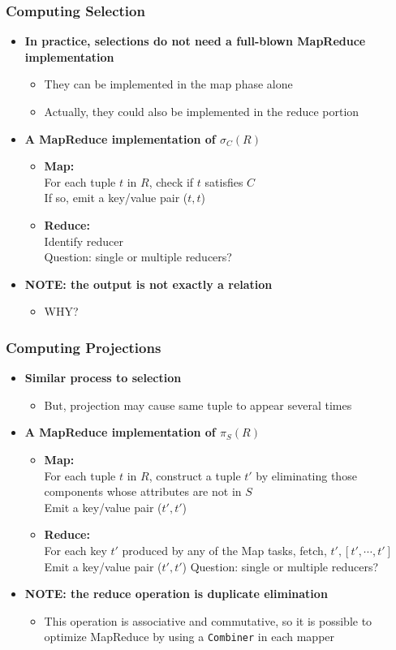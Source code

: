 \documentclass{beamer}
\newcommand{\bi}{\begin{itemize}}
\newcommand{\ei}{\end{itemize}}
\newcommand{\ii}{\item}
\newcommand*{\mygreen}[1]{\textcolor{mygreen}{#1}}
\newcommand*{\myred}[1]{\textcolor{myred}{#1}}
\newcommand{\select}{\sigma}
\newcommand{\project}{\pi}
\begin{document}
\begin{frame}
\frametitle{Computing Selection}
\bi
\ii \textbf{In practice, selections do not need a full-blown MapReduce implementation}
\bi
\ii They can be implemented in the \myred{map phase alone}
\ii Actually, they could also be implemented in the reduce portion
\ei
\ei

\bi
\ii \textbf{A MapReduce implementation of $\select_C(R)$}
\bi
\ii \mygreen{\textbf{Map:}} \\
For each tuple $t$ in $R$, check if $t$ satisfies $C$ \\
If so, emit a key/value pair ($t, t$)
\ii \mygreen{\textbf{Reduce:}}\\
Identify reducer \\
\myred{Question:} single or multiple reducers? 
\ei
\ei

\bi
\ii \textbf{NOTE: the output is not exactly a relation}
\bi
\ii \myred{WHY?}
\ei
\ei

\end{frame}



\begin{frame}
\frametitle{Computing Projections}
\bi
\ii \textbf{Similar process to selection}
\bi
\ii But, projection may cause same tuple to appear several times
\ei
\ei

\bi
\ii \textbf{A MapReduce implementation of $\project_S(R)$}
\bi
\ii \mygreen{\textbf{Map:}} \\
For each tuple $t$ in $R$, construct a tuple $t'$ by eliminating those components whose attributes are not in $S$ \\
Emit a key/value pair ($t', t'$)
\ii \mygreen{\textbf{Reduce:}}\\
For each key $t'$ produced by any of the Map tasks, fetch, $t', [t', \cdots , t']$\\
Emit a key/value pair ($t', t'$)
\myred{Question:} single or multiple reducers? 
\ei
\ei

\bi
\ii \textbf{NOTE: the reduce operation is \myred{duplicate elimination}}
\bi
\ii This operation is associative and commutative, so it is possible to optimize MapReduce by using a \texttt{Combiner} in each mapper
\ei
\ei

\end{frame}

\end{document}

